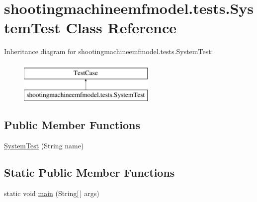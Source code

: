 \hypertarget{classshootingmachineemfmodel_1_1tests_1_1_system_test}{\section{shootingmachineemfmodel.\-tests.\-System\-Test Class Reference}
\label{classshootingmachineemfmodel_1_1tests_1_1_system_test}
}
Inheritance diagram for shootingmachineemfmodel.\-tests.\-System\-Test\-:\begin{figure}[H]
\begin{center}
\leavevmode
\includegraphics[height=2.000000cm]{classshootingmachineemfmodel_1_1tests_1_1_system_test}
\end{center}
\end{figure}
\subsection*{Public Member Functions}
\begin{DoxyCompactItemize}
\item 
\hyperlink{classshootingmachineemfmodel_1_1tests_1_1_system_test_a5ed0ebc55cdb04bbfd1bae3f3438efbb}{System\-Test} (String name)
\end{DoxyCompactItemize}
\subsection*{Static Public Member Functions}
\begin{DoxyCompactItemize}
\item 
static void \hyperlink{classshootingmachineemfmodel_1_1tests_1_1_system_test_ae565de992482b183f41f51d4a5854c52}{main} (String\mbox{[}$\,$\mbox{]} args)
\end{DoxyCompactItemize}

